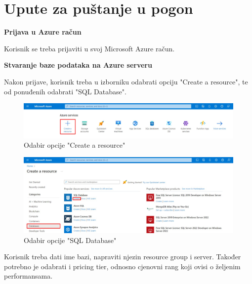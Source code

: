 \eject 

\section{Upute za puštanje u pogon}

		
		\textbf{Prijava u Azure račun}
		
	   \noindent Korisnik se treba prijaviti u svoj Microsoft Azure račun.
		
		\vspace{10mm}
		
		\noindent\textbf{Stvaranje baze podataka na Azure serveru}

		\noindent Nakon prijave, korisnik treba u izborniku odabrati opciju "Create a resource", te od ponuđenih odabrati "SQL Database".

		\vspace{10mm}
	
		\begin{figure}[H]
			 \includegraphics[width=\linewidth]{./slike/baza0.jpg}
			  \centering
			  \caption{Odabir opcije "Create a resource"}
		  \end{figure}

		\vspace{20mm}
		
	
		\begin{figure}[H]
			 \includegraphics[width=\linewidth]{./slike/baza1.jpg}
			  \centering
			  \caption{Odabir opcije "SQL Database"}
		  \end{figure}
		  
	
	\vspace{25mm}

	   \noindent Korisnik treba dati ime bazi, napraviti njezin resource group i server. Također potrebno je odabrati i pricing tier, odnosno cjenovni rang koji ovisi o željenim performansama.
	
